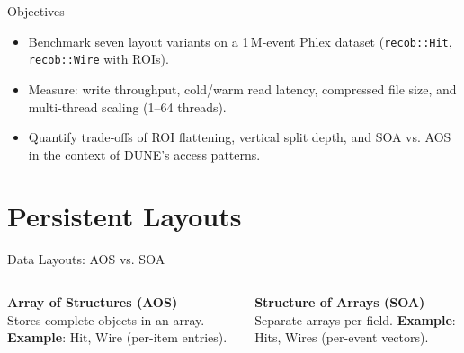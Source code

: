 \documentclass[aspectratio=169]{beamer}
\begin{document}
\begin{frame}{Objectives}
  \begin{itemize}
    \item Benchmark seven layout variants on a 1\,M‑event Phlex dataset (\texttt{recob::Hit}, \texttt{recob::Wire} with ROIs).
    \item Measure: write throughput, cold/warm read latency, compressed file size, and multi‑thread scaling (1--64 threads).
    \item Quantify trade‑offs of ROI flattening, vertical split depth, and SOA vs. AOS in the context of DUNE’s access patterns.
  \end{itemize}
\end{frame}

\section{Persistent Layouts}
\begin{frame}{Data Layouts: AOS vs. SOA}
  \begin{columns}
    \textbf{Array of Structures (AOS)} \\
    \small Stores complete objects in an array. 
    \vspace{0.5em}
    \vspace{0.5em}
    \textbf{Example}: Hit, Wire (per-item entries).

    \textbf{Structure of Arrays (SOA)} \\
    \small Separate arrays per field.
    \vspace{0.5em}
    \vspace{0.5em}
    \textbf{Example}: Hits, Wires (per-event vectors).
  \end{columns}
  \vspace{1em}
\end{frame}
\end{document}
